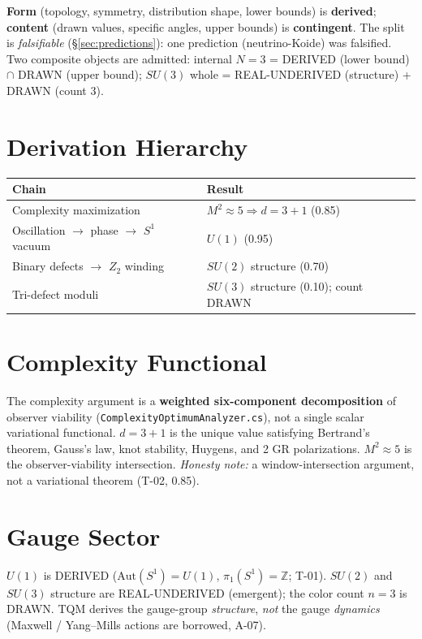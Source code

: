 \documentclass[11pt,a4paper]{article}
\begin{document}
\textbf{Form} (topology, symmetry, distribution shape, lower bounds) is \textbf{derived};
\textbf{content} (drawn values, specific angles, upper bounds) is \textbf{contingent}. The
split is \emph{falsifiable} (§\ref{sec:predictions}): one prediction (neutrino-Koide) was
falsified. Two composite objects are admitted: internal $N=3$ =
DERIVED (lower bound) $\cap$ DRAWN (upper bound); $SU(3)$ whole =
REAL-UNDERIVED (structure) + DRAWN (count 3).

\section{Derivation Hierarchy}
\label{sec:hierarchy}

\begin{center}
\begin{tabular}{ll}
\toprule
Chain & Result \\
\midrule
Complexity maximization & $M^2\approx5\Rightarrow d=3{+}1$ (0.85) \\
Oscillation $\to$ phase $\to$ $S^1$ vacuum & $U(1)$ (0.95) \\
Binary defects $\to$ $Z_2$ winding & $SU(2)$ structure (0.70) \\
Tri-defect moduli & $SU(3)$ structure (0.10); count DRAWN \\
\bottomrule
\end{tabular}
\end{center}

\section{Complexity Functional}
\label{sec:complexity}

The complexity argument is a \textbf{weighted six-component decomposition} of observer
viability (\texttt{ComplexityOptimumAnalyzer.cs}), not a single scalar variational
functional. $d=3{+}1$ is the unique value satisfying Bertrand's theorem, Gauss's law,
knot stability, Huygens, and 2 GR polarizations. $M^2\approx5$ is the
observer-viability intersection. \emph{Honesty note:} a window-intersection argument, not
a variational theorem (T-02, 0.85).

\section{Gauge Sector}
\label{sec:gauge}

$U(1)$ is DERIVED ($\mathrm{Aut}(S^1)=U(1)$, $\pi_1(S^1)=\mathbb{Z}$; T-01). $SU(2)$ and
$SU(3)$ structure are REAL-UNDERIVED (emergent); the color count $n=3$ is DRAWN. TQM
derives the gauge-group \emph{structure}, \emph{not} the gauge \emph{dynamics} (Maxwell /
Yang--Mills actions are borrowed, A-07).
\end{document}
